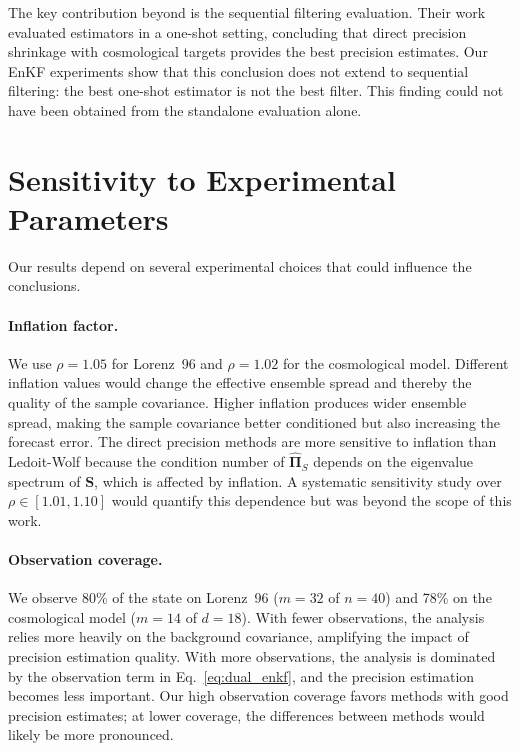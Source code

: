 The key contribution beyond \citep{looijmans2024comparison} is the sequential filtering evaluation. Their work evaluated estimators in a one-shot setting, concluding that direct precision shrinkage with cosmological targets provides the best precision estimates. Our EnKF experiments show that this conclusion does not extend to sequential filtering: the best one-shot estimator is not the best filter. This finding could not have been obtained from the standalone evaluation alone.

\section{Sensitivity to Experimental Parameters}
\label{sec:disc_sensitivity}

Our results depend on several experimental choices that could influence the conclusions.

\paragraph{Inflation factor.} We use $\rho = 1.05$ for Lorenz~96 and $\rho = 1.02$ for the cosmological model. Different inflation values would change the effective ensemble spread and thereby the quality of the sample covariance. Higher inflation produces wider ensemble spread, making the sample covariance better conditioned but also increasing the forecast error. The direct precision methods are more sensitive to inflation than Ledoit-Wolf because the condition number of $\hat{\boldsymbol{\Pi}}_S$ depends on the eigenvalue spectrum of $\mathbf{S}$, which is affected by inflation. A systematic sensitivity study over $\rho \in [1.01, 1.10]$ would quantify this dependence but was beyond the scope of this work.

\paragraph{Observation coverage.} We observe 80\% of the state on Lorenz~96 ($m = 32$ of $n = 40$) and 78\% on the cosmological model ($m = 14$ of $d = 18$). With fewer observations, the analysis relies more heavily on the background covariance, amplifying the impact of precision estimation quality. With more observations, the analysis is dominated by the observation term in Eq.~\eqref{eq:dual_enkf}, and the precision estimation becomes less important. Our high observation coverage favors methods with good precision estimates; at lower coverage, the differences between methods would likely be more pronounced.

